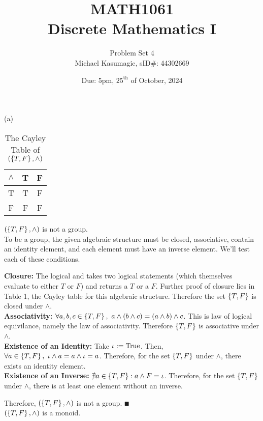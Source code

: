 \documentclass[a4paper, 11pt]{report}
\title{\Huge{MATH1061}\\Discrete Mathematics I}
\author{\huge{Problem Set 4}\\\huge{Michael Kasumagic, sID\#: 44302669}}
\date{\huge{Due: 5pm, $25^\text{th}$ of October, 2024}}
\begin{document}
\maketitle

\sol (a) \\
\begin{table}[h]
  \begin{center}
    \begin{tabular}{c|cc}
      $\land$ & T & F \\ \hline
      T       & T & F \\
      F       & F & F \\   
    \end{tabular}
    \caption{The Cayley Table of $(\left\lbrace T,F \right\rbrace,\land)$}  
  \end{center}
\end{table}

\Claim $(\left\lbrace T,F \right\rbrace,\land)$ is not a group. \\
\proof To be a group, the given algebraic structure must be closed, associative, contain an identity element, and each element must have an inverse element. We'll test each of these conditions. \\ 
\begin{list}{}{\setlength{\leftmargin}{0.5in}\setlength{\topsep}{0pt}}\item 
  \textbf{Closure:} The logical and takes two logical statements (which themselves evaluate to either $T$ or $F$) and returns a $T$ or a $F$. Further proof of closure lies in Table 1, the Cayley table for this algebraic structure. Therefore the set $\left\lbrace T,F \right\rbrace$ is closed under $\land$. \\
  \textbf{Associativity:} $\forall a,b,c\in\left\lbrace T,F \right\rbrace,\ a\land(b\land c) = (a\land b)\land c$. This is law of logical equivilance, namely the law of associativity. Therefore $\left\lbrace T,F \right\rbrace$ is associative under $\land$. \\
  \textbf{Existence of an Identity:} Take $\iota:=\text{True}$. Then, $\forall a\in\left\lbrace T,F \right\rbrace,\ \iota\land a = a\land \iota = a$. Therefore, for the set $\left\lbrace T,F \right\rbrace$ under $\land$, there exists an identity element. \\
  \textbf{Existence of an Inverse:} $\nexists a\in\left\lbrace T,F \right\rbrace: a\land F = \iota$. Therefore, for the set $\left\lbrace T,F \right\rbrace$ under $\land$, there is at least one element without an inverse. \\
\end{list}
Therefore, $(\left\lbrace T,F \right\rbrace, \land)$ is not a group. $\QED$ \\
\Corol $(\left\lbrace T,F \right\rbrace, \land)$ is a monoid. \\
\end{document}

